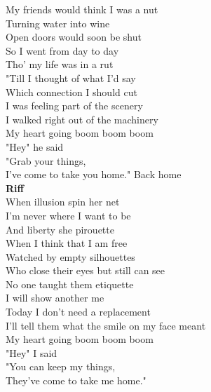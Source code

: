    My friends would think I was a nut\\
   Turning water into wine\\
   Open doors would soon be shut\\
   So I went from day to day\\
   Tho' my life was in a rut\\
   "Till I thought of what I'd say\\
   Which connection I should cut\\
I was feeling part of the scenery\\
I walked right out of the machinery\\
My heart going  boom boom boom\\
"Hey" he  said   \\
"Grab your things,\\
I've come to take you home." Back home\\
\textbf{Riff}\\
   When illusion spin her net\\
   I'm never where I want to be\\
   And liberty she pirouette\\
   When I think that I am free\\
   Watched by empty silhouettes\\
   Who close their eyes but still can see\\
   No one taught them etiquette\\
   I will show another me\\
Today I don't need a replacement\\
I'll tell them what the smile on my face meant\\
My heart going  boom boom boom\\
"Hey" I  said   \\
"You can keep my things,\\
They've come to take me home."\\
